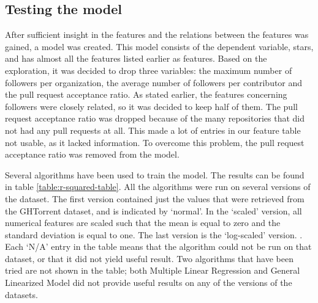     \subsection{Testing the model}
        After sufficient insight in the features and the relations between the features was gained, a model was created. 
        This model consists of the dependent variable, stars, and has almost all the features listed earlier as features. 
        Based on the exploration, it was decided to drop three variables: the maximum number of followers per organization, the average number of followers per contributor and the pull request acceptance ratio.
        As stated earlier, the features concerning followers were closely related, so it was decided to keep half of them. 
        The pull request acceptance ratio was dropped because of the many repositories that did not had any pull requests at all. 
        This made a lot of entries in our feature table not usable, as it lacked information. 
        To overcome this problem, the pull request acceptance ratio was removed from the model.
        
        Several algorithms have been used to train the model. 
        The results can be found in table \ref{table:r-squared-table}.
        All the algorithms were run on several versions of the dataset. The first version contained just the values that were retrieved from the GHTorrent dataset, and is indicated by `normal'. 
        In the `scaled' version, all numerical features are scaled such that the mean is equal to zero and the standard deviation is equal to one. 
        The last version is the `log-scaled' version. .
        Each `N/A' entry in the table means that the algorithm could not be run on that dataset, or that it did not yield useful result.
        Two algorithms that have been tried are not shown in the table; both Multiple Linear Regression and General Linearized Model did not provide useful results on any of the versions of the datasets.
        
